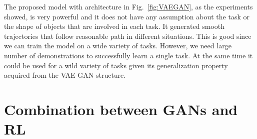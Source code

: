The proposed model with architecture in Fig.~\ref{fig:VAEGAN}, as the experiments showed, is very powerful and it does not have any assumption about the task or the shape of objects that are involved in each task. It generated smooth trajectories that follow reasonable path in different situations. This is good since we can train the model on a wide variety of tasks. However, we need large number of demonstrations to successfully learn a single task. At the same time it could be used for a wild variety of tasks given its generalization property acquired from the VAE-GAN structure.

\section{Combination between GANs and RL}

